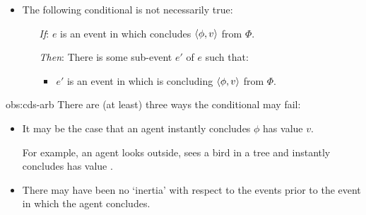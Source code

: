 \begin{note}
  \begin{observation}
    \label{obs:cds-arb}

    \begin{itemize}
    \item
      The following conditional is not necessarily true:
      \begin{itemize}
      \item[\emph{If}:]
        \(e\) is an event in which \vAgent{} concludes \(\langle \phi, v \rangle\) from \(\Phi\).
      \item[\emph{Then}:]
        There is some sub-event \(e'\) of \(e\) such that:
        \begin{itemize}
        \item
          \(e'\) is an event in which \vAgent{} is concluding \(\langle \phi, v \rangle\) from \(\Phi\).
        \end{itemize}
      \end{itemize}
    \end{itemize}
    \vspace{-\baselineskip}
  \end{observation}

  \begin{argument}{obs:cds-arb}
    There are (at least) three ways the conditional may fail:
    \begin{itemize}[leftmargin=*]
    \item
      It may be the case that an agent instantly concludes \(\phi\) has value \(v\).

      For example, an agent looks outside, sees a bird in a tree and instantly concludes  has value .
    \item
      There may have been no `inertia' with respect to the events prior to the event in which the agent concludes.


\end{itemize}
\end{argument}
\end{note}
